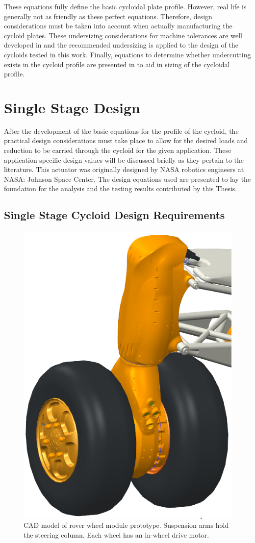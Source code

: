 These equations fully define the basic cycloidal plate profile. However, real life is generally not as friendly as these perfect equations. Therefore, design considerations must be taken into account when actually manufacturing the cycloid plates. These undersizing considerations for machine tolerances are well developed in \cite{ref:design_and_application} and the recommended undersizing is applied to the design of the cycloids tested in this work. Finally, equations to determine whether undercutting exists in the cycloid profile are presented in \cite{ref:ye} to aid in sizing of the cycloidal profile. 



\section{Single Stage Design} \label{ch:design:single}

After the development of the basic equations for the profile of the cycloid, the practical design considerations must take place to allow for the desired loads and reduction to be carried through the cycloid for the given application. These application specific design values will be discussed briefly as they pertain to the literature. This actuator was originally designed by NASA robotics engineers at NASA: Johnson Space Center. The design equations used are presented to lay the foundation for the analysis and the testing results contributed by this Thesis.

\subsection{Single Stage Cycloid Design Requirements}

\begin{figure}[h]
   \centering
   \includegraphics[width=0.40\linewidth]{fig/wheel_module_CAD}
   \caption{CAD model of rover wheel module prototype.
   Suspension arms hold the steering column.
   Each wheel has an in-wheel drive motor.}
   \label{fig:wheel_module}
\end{figure}

